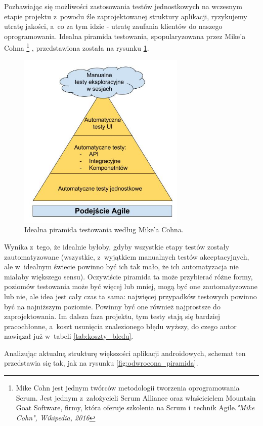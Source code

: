 Pozbawiając się możliwości zastosowania testów jednostkowych na wczesnym etapie projektu z~powodu źle zaprojektowanej struktury aplikacji, ryzykujemy utratę jakości, a~co za tym idzie - utratę zaufania klientów do naszego oprogramowania. Idealna piramida testowania, spopularyzowana przez Mike’a Cohna \footnote{Mike Cohn jest jednym twórców metodologii tworzenia oprogramowania Scrum. Jest jednym z~założycieli Scrum Alliance oraz właścicielem Mountain Goat Software, firmy, która oferuje szkolenia na Scrum i~technik Agile.\textit{"Mike Cohn", Wikipedia, 2016}}   \cite{bib:cohn:agile}, przedstawiona została na rysunku \ref{fig:idealna_piramida}.

\begin{figure}[!htb]
    \centering
    \includegraphics[width=8cm]{imgs/ch3_idealna_piramida.jpg}
    \caption
{Idealna piramida testowania według Mike'a Cohna\cite{bib:cohn:agile}.}
    \label{fig:idealna_piramida}
\end{figure} 

Wynika z~tego, że idealnie byłoby, gdyby wszystkie etapy testów zostały zautomatyzowane (wszystkie, z~wyjątkiem manualnych testów akceptacyjnych, ale w~idealnym świecie powinno być ich tak mało, że ich automatyzacja nie miałaby większego sensu). Oczywiście piramida ta może przybierać różne formy, poziomów testowania może być więcej lub mniej, mogą być one zautomatyzowane lub nie, ale idea jest cały czas ta sama: najwięcej przypadków testowych powinno być na najniższym poziomie. Powinny być one również najprostsze do zaprojektowania. Im dalsza faza projektu, tym testy stają się bardziej pracochłonne, a~koszt usunięcia znalezionego błędu wyższy, do czego autor nawiązał już w~tabeli \ref{tab:koszty_bledu}.

Analizując aktualną strukturę większości aplikacji androidowych, schemat ten przedstawia się tak, jak na rysunku \ref{fig:odwrocona_piramida}.

